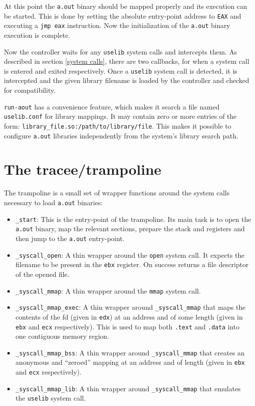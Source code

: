 \documentclass[draft,final]{vutinfth} %
\begin{document}
At this point the \texttt{a.out} binary should be mapped properly and its execution can be started. This is done by setting the absolute entry-point address to \texttt{EAX} and executing a \texttt{jmp eax} instruction. Now the initialization of the \texttt{a.out} binary execution is complete.

Now the controller waits for any \texttt{uselib} system calls and intercepts them. As described in section \ref{system calls}, there are two callbacks, for when a system call is entered and exited respectively. Once a \texttt{uselib} system call is detected, it is intercepted and the given library filename is loaded by the controller and checked for compatibility.

\texttt{run-aout} has a convenience feature, which makes it search a file named \texttt{uselib.conf} for library mappings. It may contain zero or more entries of the form: \texttt{library\_file.so:/path/to/library/file}. This makes it possible to configure \texttt{a.out} libraries independently from the system's library search path.

\section{The tracee/trampoline}

The trampoline is a small set of wrapper functions around the system calls necessary to load \texttt{a.out} binaries:

\begin{itemize}
    \item \texttt{\_start}: This is the entry-point of the trampoline. Its main task is to open the \texttt{a.out} binary, map the relevant sections, prepare the stack and registers and then jump to the \texttt{a.out} entry-point.
    \item \texttt{\_syscall\_open}: A thin wrapper around the \texttt{open} system call. It expects the filename to be present in the \texttt{ebx} register. On success returns a file descriptor of the opened file.
    \item \texttt{\_syscall\_mmap}: A thin wrapper around the \texttt{mmap} system call.
    \item \texttt{\_syscall\_mmap\_exec}: A thin wrapper around \texttt{\_syscall\_mmap} that maps the contents of the fd (given in \texttt{edx}) at an address and of some length (given in \texttt{ebx} and \texttt{ecx} respectively). This is used to map both \texttt{.text} and \texttt{.data} into one contiguous memory region.
    \item \texttt{\_syscall\_mmap\_bss}: A thin wrapper around \texttt{\_syscall\_mmap} that creates an anonymous and ``zeroed'' mapping at an address and of length (given in \texttt{ebx} and \texttt{ecx} respectively).
    \item \texttt{\_syscall\_mmap\_lib}: A thin wrapper around \texttt{\_syscall\_mmap} that emulates the \texttt{uselib} system call.
\end{itemize}
\end{document}
